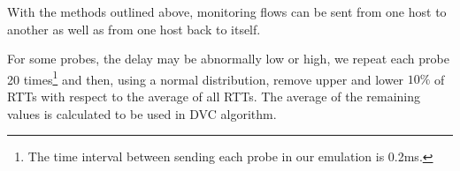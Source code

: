 \documentclass[10pt, journal, letterpaper]{IEEEtran}
\begin{document}
\begin{table}[ht]
\caption{Flow tables of switches, example 2.}\label{tab:flow_tables_example_2}
\centering
{}
\end{table}

With the methods outlined above, monitoring flows can be sent from one host to another as well as from one host back to itself.

For some probes, the delay may be abnormally low or high, we repeat each probe 20 times\footnote{The time interval between sending each probe in our emulation is 0.2ms.} and then, using a normal distribution, remove upper and lower $10\%$ of RTTs with respect to the average of all RTTs.%
The average of the remaining values is calculated to be used in DVC algorithm.
\end{document}
